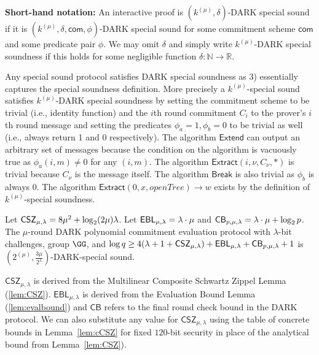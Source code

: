 \begin{definition}
\textbf{Short-hand notation:} An interactive proof is $(k^{(\mu)}, \delta)$-DARK special sound if it is $(k^{(\mu)}, \delta, \textsf{com}, \phi)$-DARK special sound for some commitment scheme $\textsf{com}$ and some predicate pair $\phi$. We may omit $\delta$ and simply write $k^{(\mu)}$-DARK special soundness if this holds for some negligible function $\delta: \mathbb{N} \rightarrow \mathbb{R}$. 
\end{definition} 

\begin{remark} Any special sound protocol satisfies DARK special soundness as 3) essentially captures the special soundness definition. More precisely a $k^{(\mu)}$-special sound satisfies $k^{(\mu)}$-DARK special soundness by setting the commitment scheme to be trivial (i.e., identity function) and the $i$th round commitment $C_i$ to the prover's $i$th round message and setting the predicates $\phi_a=1, \phi_b=0$ to be trivial as well (i.e., always return 1 and 0 respectively). The algorithm $\textsf{Extend}$ can output an arbitrary set of messages because the condition on the algorithm is vacuously true as $\phi_a(i,m) \neq 0$ for any $(i,m)$. The algorithm $\textsf{Extract}(i, \nu, C_\nu, *)$ is trivial because $C_\nu$ is the message itself. The algorithm $\textsf{Break}$ is also trivial as $\phi_b$ is always $0$. The algorithm $\textsf{Extract}(0, x, openTree) \rightarrow w$ exists by the definition of $k^{(\mu)}$-special soundness. %
\end{remark}

\begin{theorem}\label{thm:darkisdarkss} Let $\CSZ = 8 \mu^{2} + \log_2 (2 \mu) \lambda$. Let $\EBL=\lambda\cdot \mu$ and $\CorrectnessBound=\lambda\cdot \mu+\log_2 p$. The $\mu$-round DARK polynomial commitment evaluation protocol with $\lambda$-bit challenges, group $\GG$, and $\log q \geq 4(\lambda + 1 + \CSZ[\mu]) + \EBL[\mu] + \CorrectnessBound + 1$ is $(2^{(\mu)}, \frac{3\mu}{2^\lambda})$-DARK-special sound. 
\end{theorem} 

\begin{remark} $\mathsf{CSZ}_{\mu, \lambda}$ is derived from the Multilinear Composite Schwartz Zippel Lemma (\cref{lem:CSZ}). $\mathsf{EBL}_{\mu, \lambda}$ is derived from the Evaluation Bound Lemma (\cref{lem:evalbound}) and $\mathsf{CB}$ refers to the final round check bound in the DARK protocol. We can also substitute any value for $\mathsf{CSZ}_{\mu,\lambda}$ using the table of concrete bounds in Lemma~\ref{lem:cCSZ} for fixed $120$-bit security in place of the analytical bound from Lemma~\ref{lem:CSZ}).%
\end{remark}


